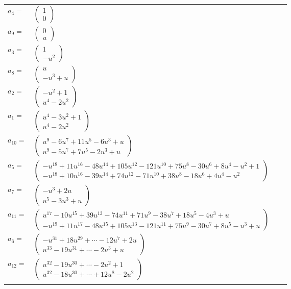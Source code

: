 \documentclass[1p]{elsarticle_modified}
\theoremstyle{definition}
\begin{document}
\begin{tabular}{m{7pt} m{180pt} m{7pt} m{180pt} }
\flushright $a_{4}=$&$\begin{pmatrix}1\\0\end{pmatrix}$ \\
\flushright $a_{9}=$&$\begin{pmatrix}0\\u\end{pmatrix}$ \\
\flushright $a_{3}=$&$\begin{pmatrix}1\\- u^2\end{pmatrix}$ \\
\flushright $a_{8}=$&$\begin{pmatrix}u\\- u^3+u\end{pmatrix}$ \\
\flushright $a_{2}=$&$\begin{pmatrix}- u^2+1\\u^4-2 u^2\end{pmatrix}$ \\
\flushright $a_{1}=$&$\begin{pmatrix}u^4-3 u^2+1\\u^4-2 u^2\end{pmatrix}$ \\
\flushright $a_{10}=$&$\begin{pmatrix}u^9-6 u^7+11 u^5-6 u^3+u\\u^9-5 u^7+7 u^5-2 u^3+u\end{pmatrix}$ \\
\flushright $a_{5}=$&$\begin{pmatrix}- u^{18}+11 u^{16}-48 u^{14}+105 u^{12}-121 u^{10}+75 u^8-30 u^6+8 u^4- u^2+1\\- u^{18}+10 u^{16}-39 u^{14}+74 u^{12}-71 u^{10}+38 u^8-18 u^6+4 u^4- u^2\end{pmatrix}$ \\
\flushright $a_{7}=$&$\begin{pmatrix}- u^3+2 u\\u^5-3 u^3+u\end{pmatrix}$ \\
\flushright $a_{11}=$&$\begin{pmatrix}u^{17}-10 u^{15}+39 u^{13}-74 u^{11}+71 u^9-38 u^7+18 u^5-4 u^3+u\\- u^{19}+11 u^{17}-48 u^{15}+105 u^{13}-121 u^{11}+75 u^9-30 u^7+8 u^5- u^3+u\end{pmatrix}$ \\
\flushright $a_{6}=$&$\begin{pmatrix}- u^{31}+18 u^{29}+\cdots-12 u^7+2 u\\u^{33}-19 u^{31}+\cdots-2 u^3+u\end{pmatrix}$ \\
\flushright $a_{12}=$&$\begin{pmatrix}u^{32}-19 u^{30}+\cdots-2 u^2+1\\u^{32}-18 u^{30}+\cdots+12 u^8-2 u^2\end{pmatrix}$\\&\end{tabular}
\end{document}
